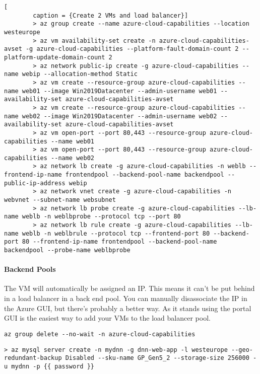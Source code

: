 \documentclass[a4paper,14pt]{report}
\begin{document}
    \begin{lstlisting}[
        caption = {Create 2 VMs and load balancer}]
        > az group create --name azure-cloud-capabilities --location westeurope
        > az vm availability-set create -n azure-cloud-capabilities-avset -g azure-cloud-capabilities --platform-fault-domain-count 2 --platform-update-domain-count 2
        > az network public-ip create -g azure-cloud-capabilities --name webip --allocation-method Static
        > az vm create --resource-group azure-cloud-capabilities --name web01 --image Win2019Datacenter --admin-username web01 --availability-set azure-cloud-capabilities-avset
        > az vm create --resource-group azure-cloud-capabilities --name web02 --image Win2019Datacenter --admin-username web02 --availability-set azure-cloud-capabilities-avset
        > az vm open-port --port 80,443 --resource-group azure-cloud-capabilities --name web01
        > az vm open-port --port 80,443 --resource-group azure-cloud-capabilities --name web02
        > az network lb create -g azure-cloud-capabilities -n weblb --frontend-ip-name frontendpool --backend-pool-name backendpool --public-ip-address webip
        > az network vnet create -g azure-cloud-capabilities -n webvnet --subnet-name websubnet
        > az network lb probe create -g azure-cloud-capabilities --lb-name weblb -n weblbprobe --protocol tcp --port 80
        > az network lb rule create -g azure-cloud-capabilities --lb-name weblb -n weblbrule --protocol tcp --frontend-port 80 --backend-port 80 --frontend-ip-name frontendpool --backend-pool-name backendpool --probe-name weblbprobe
    \end{lstlisting}

    \paragraph{Backend Pools} The VM will automatically be assigned an IP. This means it can't be put behind in a load balancer
    in a back end pool. You can manually disassociate the IP in the Azure GUI, but there's probably a better way. As it stands
    using the portal GUI is the easiest way to add your VMs to the load balancer pool.
    \begin{lstlisting}[caption={To Delete All Resources In The Group}]
    az group delete --no-wait -n azure-cloud-capabilities
    \end{lstlisting}

    \begin{lstlisting}[caption={DNN Web App}]
        > az mysql server create -n mydnn -g dnn-web-app -l westeurope --geo-redundant-backup Disabled --sku-name GP_Gen5_2 --storage-size 256000 -u mydnn -p {{ password }}
    \end{lstlisting}
\end{document}
